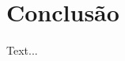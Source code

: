 \documentclass[
	article,			%
	11pt,				%
	oneside,			%
	a4paper,			%
	english,			%
	brazil,				%
	sumario=tradicional
	]{abntex2}
\begin{document}
\section{Conclusão}

Text...
% 

\postextual

%

\end{document}
